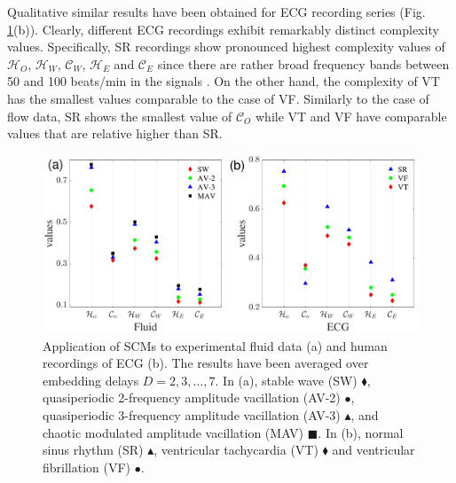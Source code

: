 \documentclass[12pt,aip,cha,reprint,nofootinbib]{revtex4-1}
\begin{document}
Qualitative similar results have been obtained for ECG recording series (Fig. \ref{fig:fluid}(b)). Clearly, different ECG recordings exhibit remarkably distinct complexity values. Specifically, SR recordings show pronounced highest complexity values of $\mathcal{H}_O$, $\mathcal{H}_W$, $\mathcal{C}_W$, $\mathcal{H}_E$ and $\mathcal{C}_E$ since there are rather broad frequency bands between 50 and 100 beats/min in the signals \cite{smallCSF2002}. On the other hand, the complexity of VT has the smallest values comparable to the case of VF. Similarly to the case of flow data, SR shows the smallest value of $\mathcal{C}_O$ while VT and VF have comparable values that are relative higher than SR. 
\begin{figure}
	\centering 
	\includegraphics[width=2\columnwidth]{fluidExample.pdf}
\caption{\small{Application of SCMs to experimental fluid data (a) and human recordings of ECG (b). The results have been averaged over embedding delays $D = 2, 3, \dots, 7$. In (a), stable wave (SW) $\blacklozenge$, quasiperiodic 2-frequency amplitude vacillation (AV-2) $\bullet$, quasiperiodic 3-frequency amplitude vacillation (AV-3) $\blacktriangle$, and chaotic modulated amplitude vacillation (MAV) $\blacksquare$. In (b), normal sinus rhythm (SR) $\blacktriangle$, ventricular tachycardia (VT) $\blacklozenge$ and ventricular fibrillation (VF) $\bullet$. } \label{fig:fluid}}
\end{figure}
\end{document}
